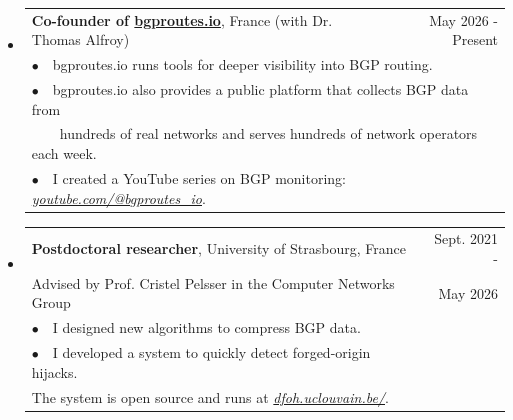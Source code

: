 \documentclass[letterpaper,11pt]{article}
\begin{document}
\begin{itemize}[label={},leftmargin=3mm]
\setlength\itemsep{1.5em}

\item

    \begin{tabular*}{6.5in}{l@{\cftdotfill{\cftsecdotsep}\extracolsep{\fill}}r}
        \sffamily \textbf{Co-founder of \href{https://bgproutes.io}{bgproutes.io}}, France (with Dr. Thomas Alfroy) & \sffamily May 2026 - Present\\
        \multicolumn{2}{l}{\sffamily $\bullet$~~bgproutes.io runs tools for deeper visibility into BGP routing.} \\
        \multicolumn{2}{l}{\sffamily $\bullet$~~bgproutes.io also provides a public platform that collects BGP data from} \\
        \multicolumn{2}{l}{\sffamily ~~~~hundreds of real networks and serves hundreds of network operators each week.} \\
        \multicolumn{2}{l}{\sffamily $\bullet$~~I created a YouTube series on BGP monitoring: \href{https://www.youtube.com/@bgproutes_io}{\textit{youtube.com/@bgproutes\_io}}.} \\
    \end{tabular*}\vspace{-10pt}

\item

    \begin{tabular*}{6.5in}{l@{\cftdotfill{\cftsecdotsep}\extracolsep{\fill}}r}
    		\sffamily \textbf{Postdoctoral researcher}, University of Strasbourg, France & \sffamily Sept. 2021 -\\
    		\sffamily Advised by Prof. Cristel Pelsser in the Computer Networks Group & \sffamily May 2026\\
			\sffamily $\bullet$~~I designed new algorithms to compress BGP data. & \\
			\sffamily $\bullet$~~I developed a system to quickly detect forged-origin hijacks. & \\
			\sffamily The system is open source and runs at \href{https://dfoh.uclouvain.be/}{\textit{dfoh.uclouvain.be/}}. & \\


    \end{tabular*}\vspace{-10pt}


\end{itemize}
\end{document}
